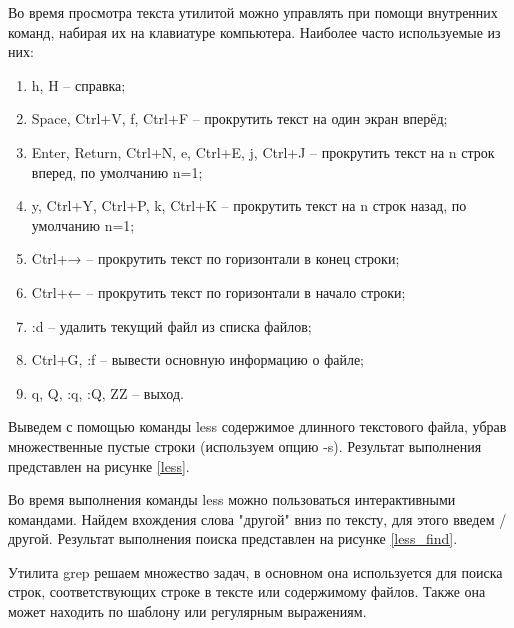 Во время просмотра текста утилитой можно управлять при помощи внутренних команд, набирая их на клавиатуре компьютера. Наиболее часто используемые из них:
\begin{enumerate}
    \item h, H -- справка;
    \item Space, Ctrl+V, f, Ctrl+F -- прокрутить текст на один экран вперёд;
    \item Enter, Return, Ctrl+N, e, Ctrl+E, j, Ctrl+J -- прокрутить текст на n строк вперед, по умолчанию n=1;
    \item y, Ctrl+Y, Ctrl+P, k, Ctrl+K -- прокрутить текст на n строк назад, по умолчанию n=1;
    \item Ctrl+→ -- прокрутить текст по горизонтали в конец строки;
    \item Ctrl+← -- прокрутить текст по горизонтали в начало строки;
    \item :d -- удалить текущий файл из списка файлов;
    \item Ctrl+G, :f -- вывести основную информацию о файле;
    \item q, Q, :q, :Q, ZZ -- выход.
\end{enumerate}

Выведем с помощью команды less содержимое длинного текстового файла, убрав множественные пустые строки (используем опцию -s).
Результат выполнения представлен на рисунке \ref{less}.


Во время выполнения команды less можно пользоваться интерактивными командами. Найдем вхождения слова "другой" вниз по тексту, для этого введем /другой. Результат выполнения поиска представлен на рисунке \ref{less_find}.


Утилита grep решаем множество задач, в основном она используется для поиска строк, соответствующих строке в тексте или содержимому файлов. Также она может находить по шаблону или регулярным выражениям.

